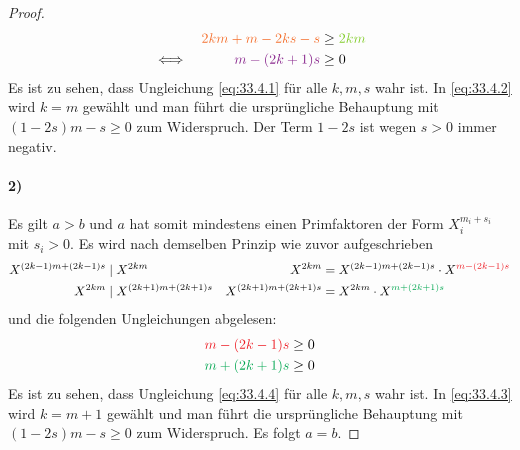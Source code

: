 \begin{proof}
  \begin{equation}
    \label{eq:33.4.2}
    \begin{aligned}
           &  & \textcolor{Orange}{2km + m - 2ks - s} & \geq \textcolor{LimeGreen}{2km} \\
      \iff &  & \textcolor{Fuchsia}{m - (2k + 1)s}    & \geq 0                          \\
    \end{aligned}
  \end{equation}
  \noindent
  Es ist zu sehen, dass Ungleichung \ref{eq:33.4.1} für alle $k,m,s$ wahr ist. In \ref{eq:33.4.2}
  wird $k = m$ gewählt und man führt die ursprüngliche Behauptung mit
  $(1 - 2s)m -s \geq 0$ zum Widerspruch. Der Term $1 - 2s$ ist wegen $s > 0$ immer negativ.

  \paragraph{2)}
  Es gilt $a > b$ und $a$ hat somit mindestens einen Primfaktoren
  der Form $X_i^{m_i + s_i}$ mit $s_i > 0$. Es wird nach demselben Prinzip wie zuvor aufgeschrieben
  \begin{align*}
    X^{(2k - 1)m + (2k -1)s}  & \mid X^{2km}                                         &
    X^{2km}                   & = X^{(2k - 1)m + (2k -1)s}
    \cdot X^{\textcolor{Red}{m - (2k - 1)s}}                                           \\
    X^{2km}                   & \mid X^{(2k + 1)m + (2k + 1)s}                       &
    X^{(2k + 1)m + (2k + 1)s} & = X^{2km} \cdot X^{\textcolor{Green}{m + (2k + 1)s}}
  \end{align*}
  und die folgenden Ungleichungen abgelesen:
  \begin{align}
    \label{eq:33.4.3}
    \textcolor{Red}{m - (2k - 1)s}   & \geq 0 \\
    \label{eq:33.4.4}
    \textcolor{Green}{m + (2k + 1)s} & \geq 0
  \end{align}
  Es ist zu sehen, dass Ungleichung \ref{eq:33.4.4} für alle $k,m,s$ wahr ist. In \ref{eq:33.4.3}
  wird $k = m + 1$ gewählt und man führt die ursprüngliche Behauptung
  mit $(1 - 2s)m - s \geq 0$ zum Widerspruch.\BigNewline
  Es folgt $a = b$.
\end{proof}